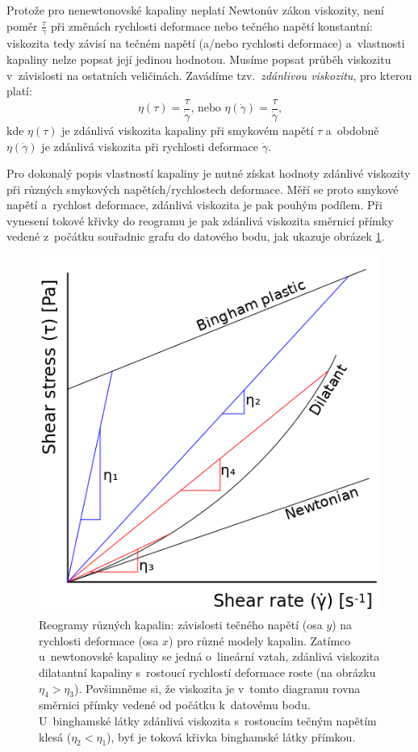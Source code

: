 \documentclass[12pt]{article}
\begin{document}
\par
Protože pro nenewtonovské kapaliny neplatí Newtonův zákon viskozity, není poměr $\frac{\tau}{\dot\gamma}$ při změnách rychlosti deformace nebo tečného napětí konstantní: viskozita tedy závisí na tečném napětí (a/nebo rychlosti deformace) a~vlastnosti kapaliny nelze popsat její jedinou hodnotou. Musíme popsat průběh viskozitu v~závislosti na ostatních veličinách. Zavádíme tzv.~\emph{zdánlivou viskozitu}, pro kterou platí:~\cite{wiki:Apparent_viscosity}
\begin{equation}
    \eta(\tau) = \frac{\tau}{\dot\gamma}\text{, nebo }\eta(\dot\gamma) = \frac{\tau}{\dot\gamma}\text{,}
    \label{eq:zdanliva_viskozita}
\end{equation}
kde $\eta(\tau)$ je zdánlivá viskozita kapaliny při smykovém napětí $\tau$ a~obdobně $\eta(\dot\gamma)$ je zdánlivá viskozita při rychlosti deformace $\dot\gamma$.
\par
Pro dokonalý popis vlastností kapaliny je nutné získat hodnoty zdánlivé viskozity při různých smykových napětích/rychlostech deformace. Měří se proto smykové napětí a~rychlost deformace, zdánlivá viskozita je pak pouhým podílem. Při vynesení tokové křivky do reogramu je pak zdánlivá viskozita směrnicí přímky vedené z~počátku souřadnic grafu do datového bodu, jak ukazuje obrázek \ref{fig:apparent_viscosity}.

\begin{figure}
    \centering
    \includegraphics[width = 0.5\linewidth]{figures/Apparent_viscosity.png}
    \caption{Reogramy různých kapalin: závislosti tečného napětí (osa $y$) na rychlosti deformace (osa $x$) pro různé modely kapalin. Zatímco u~newtonovské kapaliny se jedná o~lineární vztah, zdánlivá viskozita dilatantní kapaliny s~rostoucí rychlostí deformace roste (na obrázku $\eta_4 > \eta_3$). Povšimněme si, že viskozita je v~tomto diagramu rovna směrnici přímky vedené od počátku k~datovému bodu. U~binghamské látky zdánlivá viskozita s~rostoucím tečným napětím klesá ($\eta_2 < \eta_1$), byť je toková křivka binghamské látky přímkou.~\cite{Figure:apparent_viscosity}}
    \label{fig:apparent_viscosity}
\end{figure}
\end{document}
